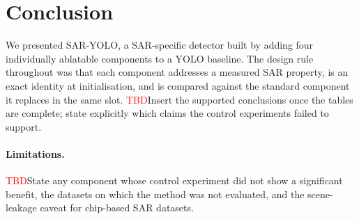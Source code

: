 \documentclass[10pt,twocolumn,letterpaper]{article}
\newcommand{\tbd}{\textcolor{red}{TBD}}
\newcommand{\ours}{\textsc{SAR-YOLO}}
\begin{document}
\section{Conclusion}
\label{sec:conclusion}
We presented \ours{}, a SAR-specific detector built by adding four individually
ablatable components to a YOLO baseline. The design rule throughout was that
each component addresses a measured SAR property, is an exact identity at
initialisation, and is compared against the standard component it replaces in the
same slot. \tbd{Insert the supported conclusions once the tables are complete;
state explicitly which claims the control experiments failed to support.}

\paragraph{Limitations.}
\tbd{State any component whose control experiment did not show a significant
benefit, the datasets on which the method was not evaluated, and the
scene-leakage caveat for chip-based SAR datasets.}

{\small


}
\end{document}
